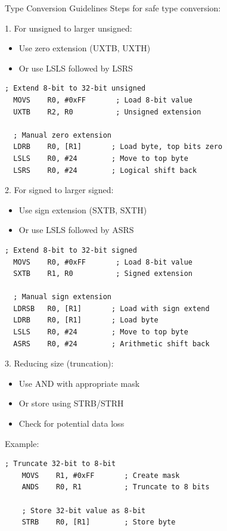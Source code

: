 \begin{KR}{Type Conversion Guidelines}
Steps for safe type conversion:

1. For unsigned to larger unsigned:
\begin{itemize}
  \item Use zero extension (UXTB, UXTH)
  \item Or use LSLS followed by LSRS
\end{itemize}

\begin{lstlisting}[language=armasm, style=basesmol]
  ; Extend 8-bit to 32-bit unsigned
  MOVS    R0, #0xFF       ; Load 8-bit value
  UXTB    R2, R0          ; Unsigned extension
  
  ; Manual zero extension
  LDRB    R0, [R1]       ; Load byte, top bits zero
  LSLS    R0, #24        ; Move to top byte
  LSRS    R0, #24        ; Logical shift back
\end{lstlisting}

2. For signed to larger signed:
\begin{itemize}
  \item Use sign extension (SXTB, SXTH)
  \item Or use LSLS followed by ASRS
\end{itemize}

\begin{lstlisting}[language=armasm, style=basesmol]
  ; Extend 8-bit to 32-bit signed
  MOVS    R0, #0xFF       ; Load 8-bit value
  SXTB    R1, R0          ; Signed extension
  
  ; Manual sign extension
  LDRSB   R0, [R1]       ; Load with sign extend
  LDRB    R0, [R1]       ; Load byte
  LSLS    R0, #24        ; Move to top byte
  ASRS    R0, #24        ; Arithmetic shift back
\end{lstlisting}


3. Reducing size (truncation):
\begin{itemize}
  \item Use AND with appropriate mask
  \item Or store using STRB/STRH
  \item Check for potential data loss
\end{itemize}


Example:
\begin{lstlisting}[language=armasm, style=basesmol]
    ; Truncate 32-bit to 8-bit
    MOVS    R1, #0xFF       ; Create mask
    ANDS    R0, R1          ; Truncate to 8 bits

    ; Store 32-bit value as 8-bit
    STRB    R0, [R1]        ; Store byte 
\end{lstlisting}
\end{KR}


